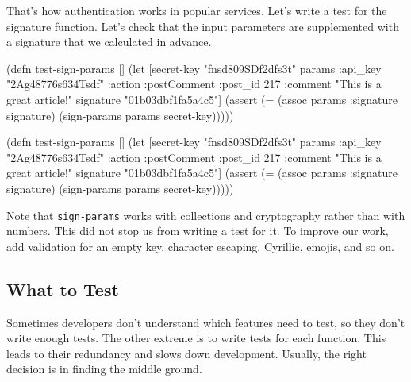 
That's how authentication works in popular services. Let's write a test for the signature function. Let's check that the input parameters are supplemented with a signature that we calculated in advance.

\label{hmac-sha256}

\ifx\DEVICETYPE\MOBILE

\begin{english}
  \begin{clojure}
(defn test-sign-params []
  (let [secret-key "fnsd809SDf2dfs3t"
        params
        {:api_key "2Ag48776s634Tsdf"
         :action :postComment
         :post_id 217
         :comment
         "This is a great article!"}
        signature "01b03dbf1fa5a4c5"]
    (assert
      (= (assoc params
           :signature signature)
         (sign-params params
           secret-key)))))
  \end{clojure}
\end{english}

\else

\begin{english}
  \begin{clojure}
(defn test-sign-params []
  (let [secret-key "fnsd809SDf2dfs3t"
        params {:api_key "2Ag48776s634Tsdf"
                :action :postComment
                :post_id 217
                :comment "This is a great article!"}
        signature "01b03dbf1fa5a4c5"]
    (assert (= (assoc params :signature signature)
               (sign-params params secret-key)))))
  \end{clojure}
\end{english}

\fi

Note that \verb|sign-params| works with collections and cryptography rather than with numbers. This did not stop us from writing a test for it. To improve our work, add validation for an empty key, character escaping, Cyrillic, emojis, and so on.

\subsection{What to Test}

Sometimes developers don't understand which features need to test, so they don't write enough tests. The other extreme is to write tests for each function. This leads to their redundancy and slows down development. Usually, the right decision is in finding the middle ground.

